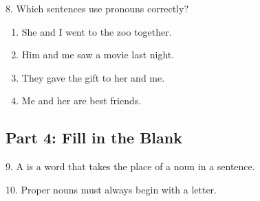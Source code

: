 \documentclass[12pt]{article}
\begin{document}
8. Which sentences use pronouns correctly?\\
\begin{enumerate}[label=\Alph*.]
    \item She and I went to the zoo together.  
    \item Him and me saw a movie last night.  
    \item They gave the gift to her and me.  
    \item Me and her are best friends.  
\end{enumerate}

\vspace{1cm}

\subsection*{Part 4: Fill in the Blank}

9. A \underline{\hspace{4cm}} is a word that takes the place of a noun in a sentence.

\vspace{2cm}

10. Proper nouns must always begin with a \underline{\hspace{4cm}} letter.









\end{document}
